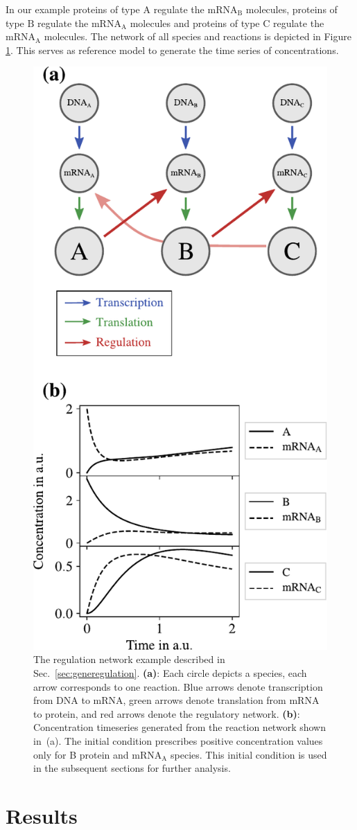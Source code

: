\documentclass[oneside, abstracton, titlepage]{scrartcl}
\begin{document}
    In our example proteins of type $\mathrm{A}$ regulate the $\mathrm{mRNA}_\mathrm{B}$ molecules, proteins of type $\mathrm{B}$ regulate the $\mathrm{mRNA}_\mathrm{A}$ molecules and proteins of type $\mathrm{C}$ regulate the $\mathrm{mRNA}_\mathrm{A}$ molecules. The network of all species and reactions is depicted in Figure \ref{fig:network}. This serves as reference model to generate the time series of concentrations.
    \begin{figure}
        \centering
        \includegraphics[width=.5\textwidth]{./figures_tex/scheme.pdf}
        \caption{The regulation network example described in Sec.~\ref{sec:generegulation}. \textbf{(a)}: Each circle depicts a species, each arrow corresponds to one reaction. Blue arrows denote transcription from DNA to mRNA, green arrows denote translation from mRNA to protein, and red arrows denote the regulatory network. \textbf{(b)}: Concentration timeseries generated from the reaction network shown in~(a). The initial condition prescribes positive concentration values only for B protein and $\mathrm{mRNA}_\mathrm{A}$ species. This initial condition is used in the subsequent sections for further analysis.}
        \label{fig:network}
    \end{figure}

	\section{Results}\label{sec:results}
	
\end{document}
